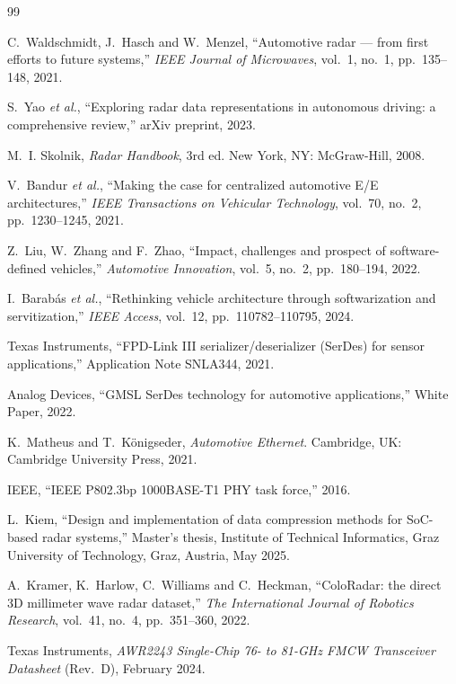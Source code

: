 \begin{thebibliography}{99}

C.~Waldschmidt, J.~Hasch and W.~Menzel, ``Automotive radar --- from first
efforts to future systems,'' \emph{IEEE Journal of Microwaves}, vol.~1, no.~1,
pp.~135--148, 2021.

S.~Yao \emph{et al.}, ``Exploring radar data representations in autonomous
driving: a comprehensive review,'' arXiv preprint, 2023.

M.~I. Skolnik, \emph{Radar Handbook}, 3rd ed. New York, NY: McGraw-Hill, 2008.

V.~Bandur \emph{et al.}, ``Making the case for centralized automotive E/E
architectures,'' \emph{IEEE Transactions on Vehicular Technology}, vol.~70,
no.~2, pp.~1230--1245, 2021.

Z.~Liu, W.~Zhang and F.~Zhao, ``Impact, challenges and prospect of
software-defined vehicles,'' \emph{Automotive Innovation}, vol.~5, no.~2,
pp.~180--194, 2022.

I.~Barab\'as \emph{et al.}, ``Rethinking vehicle architecture through
softwarization and servitization,'' \emph{IEEE Access}, vol.~12,
pp.~110782--110795, 2024.

Texas Instruments, ``FPD-Link III serializer/deserializer (SerDes) for sensor
applications,'' Application Note SNLA344, 2021.

Analog Devices, ``GMSL SerDes technology for automotive applications,'' White
Paper, 2022.

K.~Matheus and T.~K\"onigseder, \emph{Automotive Ethernet}. Cambridge, UK:
Cambridge University Press, 2021.

IEEE, ``IEEE P802.3bp 1000BASE-T1 PHY task force,'' 2016.

L.~Kiem, ``Design and implementation of data compression methods for SoC-based
radar systems,'' Master's thesis, Institute of Technical Informatics, Graz
University of Technology, Graz, Austria, May 2025.

A.~Kramer, K.~Harlow, C.~Williams and C.~Heckman, ``ColoRadar: the direct 3D
millimeter wave radar dataset,'' \emph{The International Journal of Robotics
Research}, vol.~41, no.~4, pp.~351--360, 2022.

Texas Instruments, \emph{AWR2243 Single-Chip 76- to 81-GHz FMCW Transceiver
Datasheet} (Rev.~D), February 2024.


\end{thebibliography}
